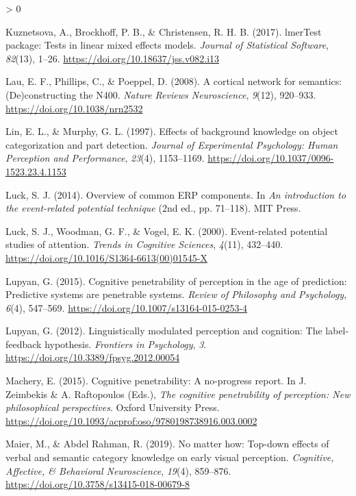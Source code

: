 \documentclass[
  english,
  doc,12pt,twoside,floatsintext]{apa7}
\newlength{\cslhangindent}
\newenvironment{CSLReferences}[2] %
 {%
  \setlength{\parindent}{0pt}
  \ifodd #1 \everypar{\setlength{\hangindent}{\cslhangindent}}\ignorespaces\fi
  \ifnum #2 > 0
  \setlength{\parskip}{#2\baselineskip}
  \fi
 }%
 {}
\begin{document}
\begin{CSLReferences}{1}{0}
\leavevmode\hypertarget{ref-R-lmerTest}{}%
Kuznetsova, A., Brockhoff, P. B., \& Christensen, R. H. B. (2017). {lmerTest} package: Tests in linear mixed effects models. \emph{Journal of Statistical Software}, \emph{82}(13), 1--26. \url{https://doi.org/10.18637/jss.v082.i13}

\leavevmode\hypertarget{ref-lau2008}{}%
Lau, E. F., Phillips, C., \& Poeppel, D. (2008). A cortical network for semantics: (De)constructing the {N400}. \emph{Nature Reviews Neuroscience}, \emph{9}(12), 920--933. \url{https://doi.org/10.1038/nrn2532}

\leavevmode\hypertarget{ref-lin1997}{}%
Lin, E. L., \& Murphy, G. L. (1997). Effects of background knowledge on object categorization and part detection. \emph{Journal of Experimental Psychology: Human Perception and Performance}, \emph{23}(4), 1153--1169. \url{https://doi.org/10.1037/0096-1523.23.4.1153}

\leavevmode\hypertarget{ref-luck2014}{}%
Luck, S. J. (2014). Overview of common ERP components. In \emph{An introduction to the event-related potential technique} (2nd ed., pp. 71--118). MIT Press.

\leavevmode\hypertarget{ref-luck2000}{}%
Luck, S. J., Woodman, G. F., \& Vogel, E. K. (2000). Event-related potential studies of attention. \emph{Trends in Cognitive Sciences}, \emph{4}(11), 432--440. \url{https://doi.org/10.1016/S1364-6613(00)01545-X}

\leavevmode\hypertarget{ref-lupyan2015}{}%
Lupyan, G. (2015). Cognitive penetrability of perception in the age of prediction: Predictive systems are penetrable systems. \emph{Review of Philosophy and Psychology}, \emph{6}(4), 547--569. \url{https://doi.org/10.1007/s13164-015-0253-4}

\leavevmode\hypertarget{ref-lupyan2012}{}%
Lupyan, G. (2012). Linguistically modulated perception and cognition: The label-feedback hypothesis. \emph{Frontiers in Psychology}, \emph{3}. \url{https://doi.org/10.3389/fpsyg.2012.00054}

\leavevmode\hypertarget{ref-machery2015}{}%
Machery, E. (2015). Cognitive penetrability: A no-progress report. In J. Zeimbekis \& A. Raftopoulos (Eds.), \emph{The cognitive penetrability of perception: New philosophical perspectives}. Oxford University Press. \url{https://doi.org/10.1093/acprof:oso/9780198738916.003.0002}

\leavevmode\hypertarget{ref-maier2019}{}%
Maier, M., \& Abdel Rahman, R. (2019). No matter how: Top-down effects of verbal and semantic category knowledge on early visual perception. \emph{Cognitive, Affective, \& Behavioral Neuroscience}, \emph{19}(4), 859--876. \url{https://doi.org/10.3758/s13415-018-00679-8}


\end{CSLReferences}
\end{document}
